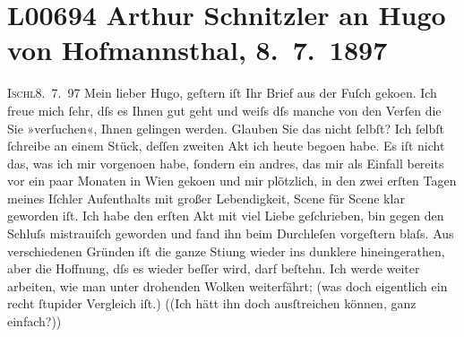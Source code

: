 

\section[Arthur Schnitzler an Hugo von Hofmannsthal, 8. 7. 1897]{L00694 Arthur Schnitzler an Hugo von Hofmannsthal, 8. 7. 1897}
\nopagebreak{}
\rehead{ }\normalsize\beginnumbering{}
\toendnotes[C]{\smallbreak\pagebreak[2]}
\toendnotes[C]{\smallbreak}
\pstart
           {\pb}\textsc{Ischl}8. 7. 97\pend
           \vspace{0.5em}
\pstart
           Mein lieber Hugo, geſtern iſt Ihr Brief aus der Fuſch geko{\geminationm}en. Ich freue mich ſehr,
               dſs es Ihnen gut geht und weiſs dſs manche von den Verſen die Sie »verſuchen«, Ihnen
               gelingen werden. Glauben Sie das nicht ſelbſt? Ich ſelbſt ſchreibe an einem Stück, deſſen zweiten Akt ich
               heute bego{\geminationn}en habe. Es iſt nicht das, was ich mir
                  vorgeno{\geminationm}en habe, ſondern ein andres, das mir als
               Einfall bereits vor ein paar Monaten in Wien
                  geko{\geminationm}en und mir plötzlich, in den zwei erſten Tagen
               meines Iſchler {\pb}Aufenthalts mit großer Lebendigkeit, Scene für Scene klar geworden iſt. Ich habe
               den erſten Akt mit viel Liebe
               geſchrieben, bin gegen den Schluſs mistrauiſch geworden und fand ihn beim Durchleſen
               vorgeſtern blaſs. Aus verschiedenen Gründen iſt die ganze Sti{\geminationm}ung wieder ins dunklere hineingerathen, aber die
               Hoffnung, dſs es wieder beſſer wird, darf beſtehn. Ich werde weiter arbeiten, wie man
               unter drohenden Wolken weiterfährt; (was doch eigentlich ein recht ſtupider Vergleich
               iſt.) ((Ich hätt ihn doch ausſtreichen können, ganz einfach?)) \pend
           
